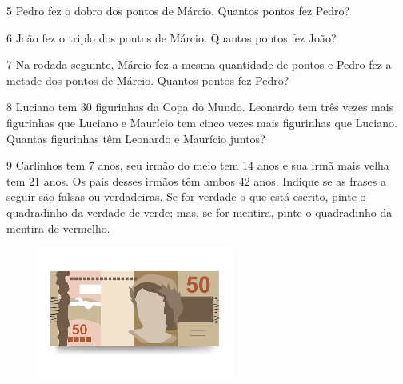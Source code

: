 \num{5} Pedro fez o dobro dos pontos de Márcio. Quantos pontos fez Pedro?


\num{6} João fez o triplo dos pontos de Márcio. Quantos pontos fez João?


\num{7} Na rodada seguinte, Márcio fez a mesma quantidade de pontos e Pedro
  fez a metade dos pontos de Márcio. Quantos pontos fez Pedro?


\num{8} Luciano tem 30 figurinhas da Copa do Mundo. Leonardo tem três
vezes mais figurinhas que Luciano e Maurício tem cinco vezes mais figurinhas que Luciano.
Quantas figurinhas têm Leonardo e Maurício juntos?




\reduline{\mbox{}\hfill}

\num{9} Carlinhos tem 7 anos, seu irmão do meio tem 14 anos e sua irmã mais
velha tem 21 anos. Os pais desses irmãos têm ambos 42 anos. Indique se
as frases a seguir são falsas ou verdadeiras. Se for verdade o que está
escrito, pinte o quadradinho da verdade de verde; mas, se for mentira,
pinte o quadradinho da mentira de vermelho.

\begin{figure}[htpb!]
\includegraphics[width=\textwidth]{./media/image109.png}
\end{figure}


